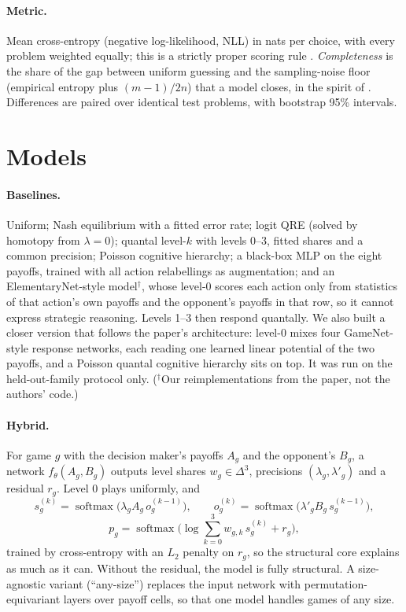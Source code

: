 \documentclass[11pt]{article}
\begin{document}
\paragraph{Metric.} Mean cross-entropy (negative log-likelihood, NLL) in nats per choice, with every
problem weighted equally; this is a strictly proper scoring rule \citep{gneiting2007strictly}.
\emph{Completeness} is the share of the gap between uniform guessing and the sampling-noise floor
(empirical entropy plus $(m-1)/2n$) that a model closes, in the spirit of
\citet{fudenberg2022completeness}. Differences are paired over identical test problems, with
bootstrap 95\% intervals.

\section{Models}

\paragraph{Baselines.} Uniform; Nash equilibrium with a fitted error rate; logit QRE (solved by
homotopy from $\lambda=0$); quantal level-$k$ with levels 0--3, fitted shares and a common precision;
Poisson cognitive hierarchy; a black-box MLP on the eight payoffs, trained with all action
relabellings as augmentation; and an ElementaryNet-style model$^\dagger$, whose level-0 scores each
action only from statistics of that action's own payoffs and the opponent's payoffs in that row, so
it cannot express strategic reasoning. Levels 1--3 then respond quantally. We also built a closer
version that follows the paper's architecture: level-0 mixes four GameNet-style response networks,
each reading one learned linear potential of the two payoffs, and a Poisson quantal cognitive
hierarchy sits on top. It was run on the held-out-family protocol only.
($^\dagger$Our reimplementations from the paper, not the authors' code.)

\paragraph{Hybrid.} For game $g$ with the decision maker's payoffs $A_g$ and the opponent's $B_g$, a
network $f_\theta(A_g,B_g)$ outputs level shares $w_g \in \Delta^3$, precisions
$(\lambda_g,\lambda'_g)$ and a residual $r_g$. Level 0 plays uniformly, and
\begin{equation}
  s_g^{(k)} = \operatorname{softmax}\!\big(\lambda_g A_g\, o_g^{(k-1)}\big),\qquad
  o_g^{(k)} = \operatorname{softmax}\!\big(\lambda'_g B_g\, s_g^{(k-1)}\big),
\end{equation}
\begin{equation}
  p_g = \operatorname{softmax}\!\Big(\log \textstyle\sum_{k=0}^{3} w_{g,k}\, s_g^{(k)} + r_g\Big),
\end{equation}
trained by cross-entropy with an $L_2$ penalty on $r_g$, so the structural core explains as much as
it can. Without the residual, the model is fully structural. A size-agnostic variant (``any-size'')
replaces the input network with permutation-equivariant layers over payoff cells, so that one model
handles games of any size.
\end{document}
